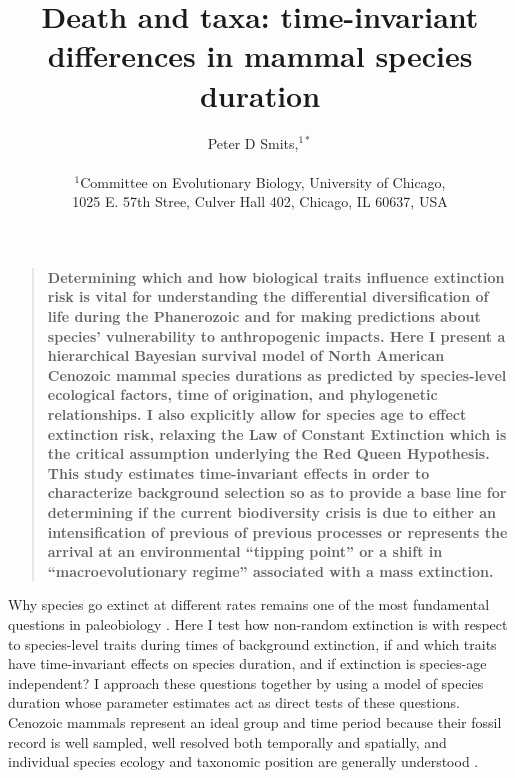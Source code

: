 \documentclass[12pt]{article}
\title{Death and taxa: time-invariant differences in mammal species duration}
\author
{Peter D Smits,$^{1\ast}$\\
\\
\normalsize{$^{1}$Committee on Evolutionary Biology, University of Chicago,}\\
\normalsize{1025 E. 57th Stree, Culver Hall 402, Chicago, IL 60637, USA}\\
}
\date{}
\newenvironment{sciabstract}{%
\begin{quote} \bf}
{\end{quote}}
\begin{document}
 


\baselineskip24pt


\maketitle 
\linenumbers
\modulolinenumbers[2]


\begin{sciabstract}
  Determining which and how biological traits influence extinction risk is vital for understanding the differential diversification of life during the Phanerozoic and for making predictions about species' vulnerability to anthropogenic impacts. Here I present a hierarchical Bayesian survival model of North American Cenozoic mammal species durations as predicted by species-level ecological factors, time of origination, and phylogenetic relationships. I also explicitly allow for species age to effect extinction risk, relaxing the Law of Constant Extinction which is the critical assumption underlying the Red Queen Hypothesis. This study estimates time-invariant effects in order to characterize background selection so as to provide a base line for determining if the current biodiversity crisis is due to either an intensification of previous of previous processes or represents the arrival at an environmental ``tipping point'' or a shift in ``macroevolutionary regime'' associated with a mass extinction.
\end{sciabstract}

Why species go extinct at different rates remains one of the most fundamental questions in paleobiology \cite{Simpson1944,VanValen1973,Raup1994,Quental2013,Wagner2014b}. Here I test how non-random extinction is with respect to species-level traits during times of background extinction, if and which traits have time-invariant effects on species duration, and if extinction is species-age independent? I approach these questions together by using a model of species duration whose parameter estimates act as direct tests of these questions. Cenozoic mammals represent an ideal group and time period because their fossil record is well sampled, well resolved both temporally and spatially, and individual species ecology and taxonomic position are generally understood \cite{Alroy2009,Liow2008,Smith2004,Quental2013,Simpson1944,Tomiya2013,Marcot2014}. 
\end{document}

